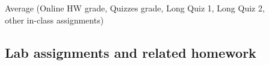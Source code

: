 \documentclass[12pt]{scrartcl}
\begin{document}

\begin{tcolorbox}[colback=blue!5,colframe=blue!75!black,title=HW / Quizzes / In-Class Assignments Grade (HW/Q/IC)]
\begin{center}
Average (Online HW grade, Quizzes grade, Long Quiz 1, Long Quiz 2, \\ other in-class assignments)\\
\end{center}
\end{tcolorbox}

\subsection{Lab assignments and related homework}
\end{document}
